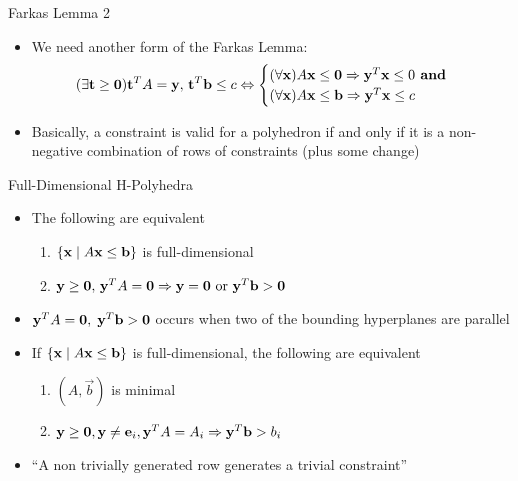 \documentclass{beamer}
\begin{document}
\begin{frame}{Farkas Lemma 2}
\begin{itemize}
  \item<1-> We need another form of the Farkas Lemma:
      \[ (\exists \mathbf{t}\geq\mathbf{0}) \mathbf{t}^T A = \mathbf{y},\, \mathbf{t}^T\mathbf{b} \leq c \Leftrightarrow
        \begin{cases}
        (\forall \mathbf{x}) A\mathbf{x}\leq \mathbf{0} \Rightarrow \mathbf{y}^T\mathbf{x} \leq 0 \textbf{ and } \\
        (\forall \mathbf{x}) A\mathbf{x}\leq \mathbf{b} \Rightarrow \mathbf{y}^T\mathbf{x} \leq c
        \end{cases}
      \]
  \item<2-> Basically, a constraint is valid for a polyhedron if and only if it is a non-negative combination of rows of constraints (plus some change)
\end{itemize}
\end{frame}

\begin{frame}{Full-Dimensional H-Polyhedra}
\begin{itemize}
  \item<1-> The following are equivalent
  \begin{enumerate}
    \item $\left\{\mathbf{x}\;|\; A\mathbf{x}\leq \mathbf{b}\right\}$ is full-dimensional
    \item $ \mathbf{y}\geq\mathbf{0},\, \mathbf{y}^T A = \mathbf{0} \Rightarrow 
      \mathbf{y} = \mathbf{0} \text{ or } \mathbf{y}^T \mathbf{b} > \mathbf{0} $
  \end{enumerate}
  \item<2-> $\mathbf{y}^T A = \mathbf{0},\;\mathbf{y}^T \mathbf{b} > \mathbf{0}$ occurs when two of the bounding hyperplanes are parallel
  \item<3-> If $\left\{\mathbf{x}\;|\; A\mathbf{x}\leq \mathbf{b}\right\}$ is full-dimensional, the following are equivalent
  \begin{enumerate}
    \item $(A,\vec{b})$ is minimal
    \item $\mathbf{y}\geq\mathbf{0},\mathbf{y}\neq\mathbf{e}_i, \mathbf{y}^T A = A_i \Rightarrow \mathbf{y}^T\mathbf{b} > b_i$
  \end{enumerate}
  \item<4-> ``A non trivially generated row generates a trivial constraint''
\end{itemize}
\end{frame}
\end{document}
